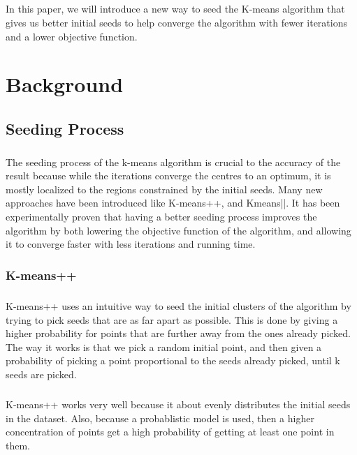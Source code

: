 \documentclass[12pt]{dalthesis}
\begin{document}
\paragraph{}
In this paper, we will introduce a new way to seed the K-means algorithm that gives us better initial seeds to help converge the algorithm with fewer iterations and a lower objective function.



\chapter{Background}

\section{Seeding Process}
\paragraph{}
The seeding process of the k-means algorithm is crucial to the accuracy of the result because while the iterations converge the centres to an optimum, it is mostly localized to the regions constrained by the initial seeds\cite{arthur2007k}.
Many new approaches have been introduced like K-means++\cite{arthur2007k}, and Kmeans||. It has been experimentally proven that having a better seeding process improves the algorithm by both lowering the objective function of the algorithm, and allowing it to converge faster with less iterations and running time.
\subsection{K-means++}
\paragraph{}
K-means++ uses an intuitive way to seed the initial clusters of the algorithm by trying to pick seeds that are as far apart as possible. This is done by giving a higher probability for points that are further away from the ones already picked. The way it works is that we pick a random initial point, and then given a probability of picking a point proportional to the seeds already picked, until k seeds are picked. 
\paragraph{}
K-means++ works very well because it about evenly distributes the initial seeds in the dataset. Also, because a probablistic model is used, then a higher concentration of points get a high probability of getting at least one point in them.
\end{document}
